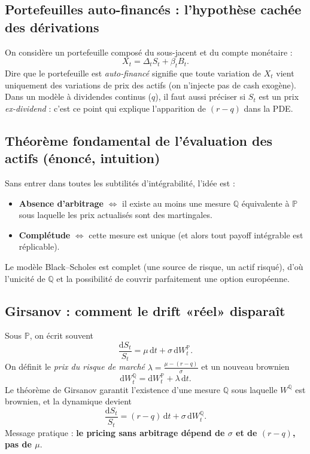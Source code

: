 \documentclass[11pt,a4paper]{report}
\theoremstyle{definition}
\theoremstyle{plain}
\theoremstyle{remark}
\newcommand{\dd}{\mathrm{d}}
\newcommand{\1}{\mathbf{1}}
\newcommand{\Pmeas}{\mathbb{P}}
\newcommand{\Qmeas}{\mathbb{Q}}
\begin{document}
\subsection*{Portefeuilles auto-financés : l'hypothèse cachée des dérivations}
On considère un portefeuille composé du sous-jacent et du compte monétaire :
\[
X_t=\Delta_t S_t + \beta_t B_t.
\]
Dire que le portefeuille est \emph{auto-financé} signifie que toute variation de $X_t$ vient uniquement des variations de prix des actifs (on n'injecte pas de cash exogène).
Dans un modèle à dividendes continus ($q$), il faut aussi préciser si $S_t$ est un prix \emph{ex-dividend} : c'est ce point qui explique l'apparition de $(r-q)$ dans la PDE.

\subsection*{Théorème fondamental de l'évaluation des actifs (énoncé, intuition)}
Sans entrer dans toutes les subtilités d'intégrabilité, l'idée est :
\begin{itemize}[leftmargin=*]
\item \textbf{Absence d'arbitrage} $\Longleftrightarrow$ il existe au moins une mesure $\Qmeas$ équivalente à $\Pmeas$ sous laquelle les prix actualisés sont des martingales.
\item \textbf{Complétude} $\Longleftrightarrow$ cette mesure est unique (et alors tout payoff intégrable est réplicable).
\end{itemize}
Le modèle Black--Scholes est complet (une source de risque, un actif risqué), d'où l'unicité de $\Qmeas$ et la possibilité de couvrir parfaitement une option européenne.

\subsection*{Girsanov : comment le drift «réel» disparaît}
Sous $\Pmeas$, on écrit souvent
\[
\frac{\dd S_t}{S_t}=\mu\,\dd t+\sigma\,\dd W_t^{\Pmeas}.
\]
On définit le \emph{prix du risque de marché} $\lambda=\frac{\mu-(r-q)}{\sigma}$ et un nouveau brownien
\[
\dd W_t^{\Qmeas}=\dd W_t^{\Pmeas}+\lambda\,\dd t.
\]
Le théorème de Girsanov garantit l'existence d'une mesure $\Qmeas$ sous laquelle $W^{\Qmeas}$ est brownien, et la dynamique devient
\[
\frac{\dd S_t}{S_t}=(r-q)\,\dd t+\sigma\,\dd W_t^{\Qmeas}.
\]
Message pratique : \textbf{le pricing sans arbitrage dépend de $\sigma$ et de $(r-q)$, pas de $\mu$}.


\end{document}

